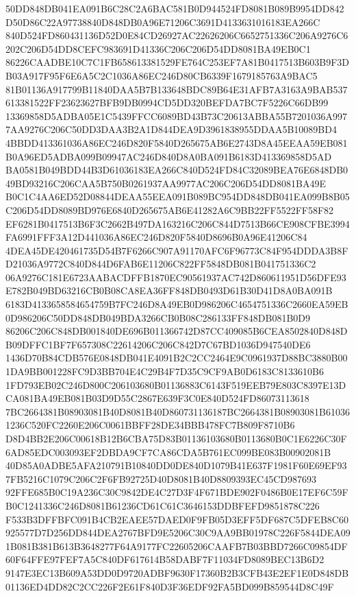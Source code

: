 \documentclass[UTF8,fontset=fandol,zihao=-4,a4paper]{ctexart}
\begin{document}
{{50DD848DB041EA091B6C28C2A6BAC581B0D944524FD8081B089B9954DD842D50D86C22A97738840D848DB0A96E71206C3691D4133631016183EA266C
840D524FD860431136D52D0E84CD26927AC22626206C6652751336C206A9276C6202C206D54DD8CEFC983691D41336C206C206D54DD8081BA49EB0C1
86226CAADBE10C7C1FB658613381529FE764C253EF7A81B0417513B603B9F3DB03A917F95F6E6A5C2C1036A86EC246D80CB6339F1679185763A9BAC5
81B01136A917799B11840DAA5B7B133648BDC89B64E31AFB7A3163A9BAB537613381522FF23623627BFB9DB0994CD5DD320BEFDA7BC7F5226C66DB99
13369858D5ADBA05E1C5439FFCC6089BD43B73C20613ABBA55B7201036A9977AA9276C206C50DD3DAA3B2A1D844DEA9D3961838955DDAA5B10089BD4
4BBDD413361036A86EC246D820F5840D265675AB6E2743D8A45EEAA59EB081B0A96ED5ADBA099B09947AC246D840D8A0BA091B6183D413369858D5AD
BA0581B049BDD44B3D61036183EA266C840D524FD84C32089BEA76E6848DB049BD93216C206CAA5B750B0261937AA9977AC206C206D54DD8081BA49E
B0C1C4AA6ED52D08844DEAA55EEA091B089BC954DD848DB041EA099B8B05C206D54DD8089BD976E6840D265675AB6E41282A6C9BB22FF5522FF58F82
EF6281B0417513B6F3C2662B497DA163216C206C844D7513B66CE908CFBE3994FA6991FFF3A12D441036A86EC246D820F5840D8696B0A96E41206C84
4DEA45DE420461735D54B7F6266C907A91170AFC6F96773C84F954DDDA3B8FD21036A9772C840D844D6FAB6E11206C822FF5848DB081B041751336C2
06A9276C181E6723AABACDFFB1870EC90561937AC742D860611951D56DFE93E782B049BD63216CB0B08CA8EA36FF848DB0493D61B30D41D8A0BA091B
6183D4133658584654759B7FC246D8A49EB0D986206C4654751336C2660EA59EB0D986206C50DD848DB049BDA3266CB0B08C286133FF848DB081B0D9
86206C206C848DB001840DE696B011366742D87CC409085B6CEA8502840D848DB09DFFC1BF7F657308C22614206C206C842D7C67BD1036D947540DE6
1436D70B84CDB576E0848DB041E4091B2C2CC2464E9C0961937D88BC3880B001DA9BB001228FC9D3BB704E4C29B4F7D35C9CF9AB0D6183C8133610B6
1FD793EB02C246D800C206103680B01136883C6143F519EEB79E803C8397E13DCA081BA49EB081B03D9D55C2867E639F3C0E840D524FD86073113618
7BC2664381B08903081B40D8081B40D860731136187BC2664381B08903081B610361236C520FC2260E206C0061BBFF28DE34BBB478FC7B809F8710B6
D8D4BB2E206C00618B12B6CBA75D83B01136103680B0113680B0C1E6226C30F6AD85EDC003093EF2DBDA9CF7CA86CDA5B761EC099BE083B00902081B
40D85A0ADBE5AFA210791B10840DD0DE840D1079B41E637F1981F60E69EF937FB5216C1079C206C2F6FB92725D40D8081B40D8809393EC45CD987693
92FFE685B0C19A236C30C9842DE4C27D3F4F671BDE902F0486B0E17EF6C59FB0C1241336C246D8081B61236CD61C61C3646153DDBFEFD9851878C226
F533B3DFFBFC091B4CB2EAEE57DAED0F9FB05D3EFF5DF687C5DFEB8C60925577D7D256DD844DEA2767BFD9E5206C30C9AA9BB01978C226F5844DEA09
1B081B381B613B3648277F64A9177FC22605206CAAFB7B03BBD7266C09854DF60F64FFE97FEF7A5C840DF617614B58DABF7F11034FD8089BEC13B6D2
9147E3EC13B609A53DD0D9720ADBF9630F17360B2B3CFB43E2EF1E0D848DB01136ED4DD82C2CC226F2E61F840D3F36EDF92FA5BD099B859544D8C49F
}}
\end{document}
